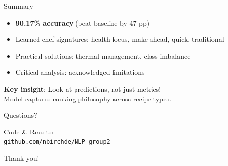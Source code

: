 \documentclass{beamer}
\begin{document}
\begin{frame}{Summary}
\begin{itemize}
    \item \textbf{90.17\% accuracy} (beat baseline by 47 pp)
    \item Learned chef signatures: health-focus, make-ahead, quick, traditional
    \item Practical solutions: thermal management, class imbalance
    \item Critical analysis: acknowledged limitations
\end{itemize}

\vspace{1cm}

\textbf{Key insight}: Look at predictions, not just metrics! \\
Model captures cooking philosophy across recipe types.
\end{frame}

\begin{frame}
\begin{center}
{\Huge Questions?}

\vspace{1cm}

{\large Code \& Results:} \\
\texttt{github.com/nbirchde/NLP\_group2}

\vspace{0.5cm}

Thank you!
\end{center}
\end{frame}
\end{document}
